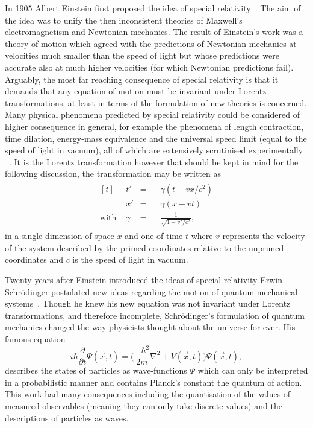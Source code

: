 In 1905 Albert Einstein first proposed the idea of special
relativity~\cite{Einstein:special}. The aim of the idea was to unify the then
inconsistent theories of Maxwell's electromagnetism and Newtonian mechanics. The
result of Einstein's work was a theory of motion which agreed with the
predictions of Newtonian mechanics at velocities much smaller than the speed of
light but whose predictions were accurate also at much higher velocities (for
which Newtonian predictions fail). Arguably, the most far reaching consequence of
special relativity is that it demands that any equation of motion must be
invariant under Lorentz transformations, at least in terms of the formulation of
new theories is concerned. Many physical phenomena predicted by special
relativity could be considered of higher consequence in general, for example the
phenomena of length contraction, time dilation, energy-mass equivalence and the
universal speed limit (equal to the speed of light in vacuum), all of which are
extensively scrutinised experimentally ~\cite{sr-tests-1, sr-tests-2,
  sr-tests-3, sr-tests-4, sr-tests-5, sr-tests-6, sr-tests-7}. It is the Lorentz
transformation however that should be kept in mind for the following discussion,
the transformation may be written as
\begin{equation}
  \begin{split}
    \begin{aligned}[t]
      &t'&=&\;\;\;\gamma(t -vx/c^{2})\\
      &x'&=&\;\;\;\gamma(x - vt)\\
      \text{with } &\gamma&=&\;\;\;\frac{1}{\sqrt{1 - v^{2}/c^{2}}},
    \end{aligned}
  \end{split}
  \label{eq:lorentz-transform}
\end{equation}
in a single dimension of space $x$ and one of time $t$ where $v$ represents the
velocity of the system described by the primed coordinates relative to the
unprimed coordinates and $c$ is the speed of light in vacuum.  

Twenty years after Einstein introduced the ideas of special relativity Erwin
Schr\"odinger postulated new ideas regarding the motion of quantum mechanical
systems~\cite{Schrodinger}. Though he knew his new equation was not invariant
under Lorentz transformations, and therefore incomplete, Schr\"odinger's
formulation of quantum mechanics changed the way physicists thought about the
universe for ever. His famous equation
\begin{equation}
  \label{eq:schrodinger}
  i\hbar\frac{\partial}{\partial t}\Psi(\vec{x}, t) =
  \Bigg(\frac{-\hbar^{2}}{2m}\nabla^{2} + V(\vec{x}, t)  \Bigg)\Psi(\vec{x}, t),
\end{equation}
describes the states of particles as wave-functions $\Psi$ which can only be
interpreted in a probabilistic manner and contains Planck's constant the quantum
of action. This work had many consequences including the quantisation of the
values of measured observables (meaning they can only take discrete values) and
the descriptions of particles as waves.

